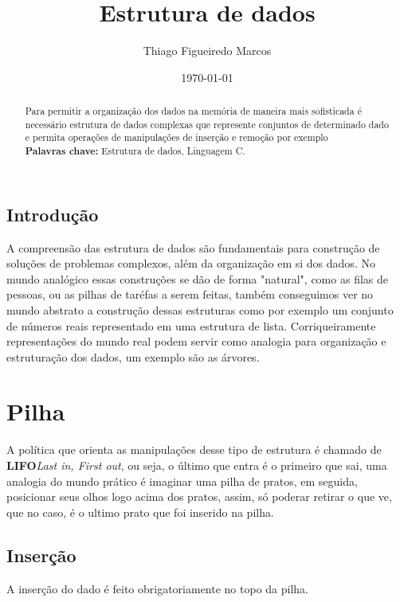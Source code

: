 \documentclass[12pt, onecolumn]{article}
\begin{document}
	\title{Estrutura de dados}
	\author{Thiago Figueiredo Marcos}
	\date{\today}
	\maketitle

	\begin{abstract}
		Para permitir a organização dos dados na memória de maneira mais sofisticada
		é necessário estrutura de dados complexas que represente conjuntos de determinado
		dado e permita operações de manipulações de inserção e remoção por exemplo \\
		\textbf{Palavras chave: } Estrutura de dados, Linguagem C.
	\end{abstract}
	
	\begin{center}
		\tableofcontents
	\end{center}

	\begin{center}
		\section{Introdução}
	\end{center}
		A compreensão das estrutura de dados são fundamentais para construção de soluções
		de problemas complexos, além da organização em si dos dados. No mundo analógico
		essas construções se dão de forma "natural", como as filas de pessoas, ou as pilhas
		de taréfas a serem feitas, também conseguimos ver no mundo abstrato a construção 
		dessas estruturas como por exemplo um conjunto de números reais representado em 
		uma estrutura de lista. Corriqueiramente representações do mundo real podem servir
		como analogia para organização e estruturação dos dados, um exemplo são as árvores.

	\section{Pilha}
		A política que orienta as manipulações desse tipo de estrutura é chamado de
		\textbf{LIFO}{\it Last in, First out}, ou seja, o último que entra é o primeiro
		que sai, uma analogia do mundo prático é imaginar uma pilha de pratos, em seguida, 
		posicionar seus olhos logo acima dos pratos, assim, só poderar retirar o que ve, que
		no caso, é o ultimo prato que foi inserido na pilha.
		\subsection{Inserção}
			A inserção do dado é feito obrigatoriamente no topo da pilha.
	
\end{document}
